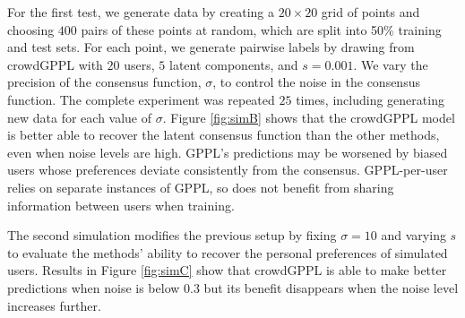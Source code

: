 For the first test,
we generate data by creating a $20\times 20$ grid of points and choosing $400$ pairs of these points at random,
which are split into  50\% training and test sets.
For each point, we generate pairwise labels by drawing from crowdGPPL
with $20$ users, $5$ latent components, and 
$s=0.001$.
We vary the precision of the consensus function, $\sigma$, to control the noise in 
the consensus function. 
The complete experiment was repeated $25$ times, including generating new data 
for each value of $\sigma$.
Figure \ref{fig:simB} shows that the crowdGPPL model is better able to recover the latent consensus
function than the other methods, even when noise levels are high. 
GPPL's predictions may be worsened by biased users whose preferences deviate
 consistently from the consensus. GPPL-per-user relies on separate instances of GPPL, so 
 does not benefit from sharing information between users when training.

The second simulation modifies the previous setup by fixing $\sigma = 10$ and varying $s$
to evaluate the methods'
ability to recover the personal preferences of simulated users.
Results in Figure \ref{fig:simC} show that crowdGPPL is able to make better 
predictions when noise is below $0.3$ but its benefit disappears when 
the noise level increases further. 

